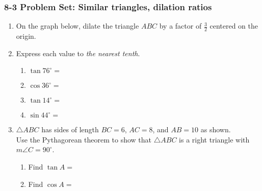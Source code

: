 \documentclass[12pt, twoside]{article}
\begin{document}
\subsubsection*{8-3 Problem Set: Similar triangles, dilation ratios}
 \begin{enumerate}


      \item On the graph below, dilate the triangle $ABC$ by a factor of $\frac{3}{2}$ centered on the origin.\\
   \vspace{0.5cm}

        \item Express each value to \emph{the nearest tenth}.  \vspace{0.5cm}
          \begin{multicols}{2}
            \begin{enumerate}
              \item $\tan 76^\circ = $ \vspace{0.5cm}
              \item $\cos 36^\circ =$
              \item $\tan 14^\circ = $ \vspace{0.5cm}
              \item $\sin 44^\circ =$
            \end{enumerate}
          \end{multicols}

        \item $\triangle ABC$ has sides of length $BC=6$, $AC=8$, and $AB=10$ as shown.\\[0.25cm] Use the Pythagorean theorem to show that $\triangle ABC$ is a right triangle with $m\angle C=90^\circ$. \vspace{4cm}
        \begin{multicols}{2}

            \begin{enumerate}
            \item Find $\tan A =$ \vspace{0.75cm}
            \item Find $\cos A =$ \vspace{0.75cm}

          \end{enumerate}
      \end{multicols}


\end{enumerate}
\end{document}
